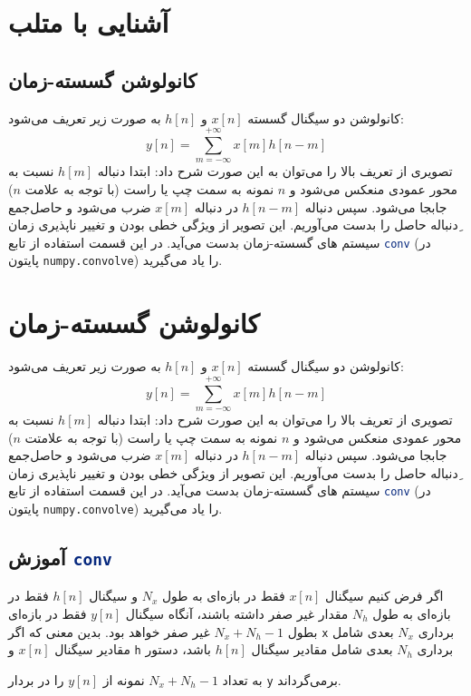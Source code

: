 \documentclass{utsignal}
\begin{document}
	\section{آشنایی با متلب}
	\subsection{کانولوشن گسسته-زمان}
	کانولوشن دو سیگنال گسسته $x[n]$ و $h[n]$ به صورت زیر تعریف می‌شود:
	$$y[n]=\sum_{m=-\infty}^{+\infty} x[m]h[n-m]$$
	تصویری از تعریف بالا را می‌توان به این صورت شرح داد: ابتدا دنباله  $h[m]$ نسبت به محور عمودی منعکس می‌شود و  $n$ نمونه به سمت چپ یا راست (با توجه به علامت $n$) جابجا می‌شود. سپس دنباله  $h[n-m]$ در دنباله  $x[m]$ ضرب می‌شود و حاصل‌جمع ِدنباله حاصل را بدست می‌آوریم. این تصویر از ویژگی خطی بودن و تغییر ناپذیری زمان سیستم های گسسته-زمان بدست می‌آید. در این قسمت استفاده از تابع \lstinline[language=Octave]{conv} (در پایتون \lstinline[language=Python]{numpy.convolve}) را یاد می‌گیرید.

	\section{کانولوشن گسسته-زمان}
	کانولوشن دو سیگنال گسسته $x[n]$ و $h[n]$ به صورت زیر تعریف می‌شود:
	$$y[n]=\sum_{m=-\infty}^{+\infty} x[m]h[n-m]$$
	تصویری از تعریف بالا را می‌توان به این صورت شرح داد: ابتدا دنباله  $h[m]$ نسبت به محور عمودی منعکس می‌شود و  $n$ نمونه به سمت چپ یا راست (با توجه به علامتت $n$) جابجا می‌شود. سپس دنباله  $h[n-m]$ در دنباله  $x[m]$ ضرب می‌شود و حاصل‌جمع ِدنباله حاصل را بدست می‌آوریم. این تصویر از ویژگی خطی بودن و تغییر ناپذیری زمان سیستم های گسسته-زمان بدست می‌آید. در این قسمت استفاده از تابع \lstinline[language=Octave]{conv} (در پایتون \lstinline[language=Python]{numpy.convolve}) را یاد می‌گیرید.

	\subsection{آموزش \lstinline[language=Octave]{conv}}
	اگر فرض کنیم سیگنال $x[n]$ فقط در بازه‌ای به طول $N_x$ و سیگنال $h[n]$ فقط در بازه‌ای به طول $N_h$ مقدار غیر صفر داشته باشند، آنگاه سیگنال $y[n]$ فقط در بازه‌ای بطول $N_x+N_h-1$ غیر صفر خواهد بود. بدین معنی که اگر  \lstinline[language=Octave]{x} برداری $N_x$ بعدی شامل مقادیر سیگنال  $x[n]$ و \lstinline[language=Octave]{h} برداری $N_h$ بعدی شامل مقادیر سیگنال $h[n]$ باشد، دستور 
	\begin{latin}
		
	\end{latin}
	\noindent به تعداد $N_x+N_h-1$ نمونه از $y[n]$ را در بردار \lstinline[language=Octave]{y} برمی‌گرداند.
	
\end{document}
